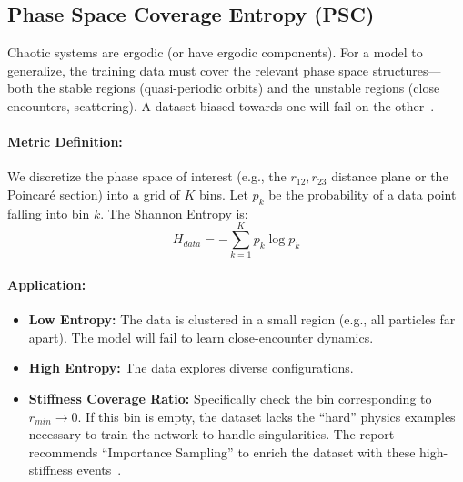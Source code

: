 \subsection{Phase Space Coverage Entropy (PSC)}

Chaotic systems are ergodic (or have ergodic components). For a model to generalize, the training data must cover the relevant phase space structures—both the stable regions (quasi-periodic orbits) and the unstable regions (close encounters, scattering). A dataset biased towards one will fail on the other~\cite{ref28}.

\paragraph{Metric Definition:}
We discretize the phase space of interest (e.g., the $r_{12}, r_{23}$ distance plane or the Poincaré section) into a grid of $K$ bins. Let $p_k$ be the probability of a data point falling into bin $k$. The Shannon Entropy is:
\begin{equation}
    H_{data} = - \sum_{k=1}^{K} p_k \log p_k
\end{equation}

\paragraph{Application:}
\begin{itemize}
    \item \textbf{Low Entropy:} The data is clustered in a small region (e.g., all particles far apart). The model will fail to learn close-encounter dynamics.
    \item \textbf{High Entropy:} The data explores diverse configurations.
    \item \textbf{Stiffness Coverage Ratio:} Specifically check the bin corresponding to $r_{min} \to 0$. If this bin is empty, the dataset lacks the ``hard'' physics examples necessary to train the network to handle singularities. The report recommends ``Importance Sampling'' to enrich the dataset with these high-stiffness events~\cite{ref9}.
\end{itemize}
